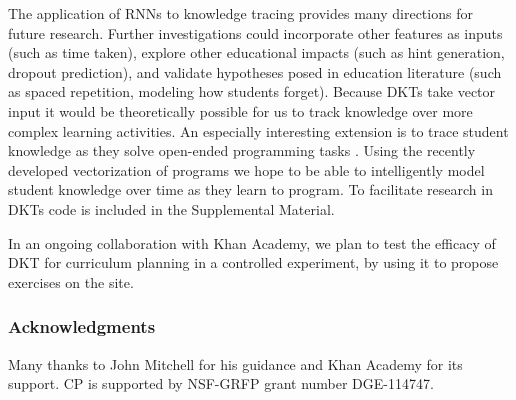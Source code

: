 The application of RNNs to knowledge tracing provides many directions for future research. Further investigations could incorporate other features as inputs (such as time taken), explore other educational impacts (such as hint generation, dropout prediction), and validate hypotheses posed in education literature (such as spaced repetition, modeling how students forget).
Because DKTs take vector input it would be theoretically possible for us to track knowledge over more complex learning activities.
An especially interesting extension is to trace student knowledge as they solve open-ended programming tasks \cite{piech2015autonomously,piech2012modeling}.
Using the recently developed vectorization of programs \cite{piechICML15} we hope to be able to intelligently model student knowledge over time as they learn to program.  To facilitate research in DKTs code is included in the Supplemental Material. 

In an ongoing collaboration with Khan Academy, we plan to test the efficacy of DKT for curriculum planning in a controlled experiment, by using it to propose exercises on the site. 


 \subsubsection*{Acknowledgments}


Many thanks to John Mitchell for his guidance and Khan Academy for its support. CP is supported by NSF-GRFP grant number DGE-114747.
